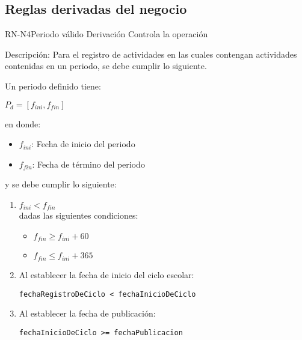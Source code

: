 \subsection{Reglas derivadas del negocio}


\begin{BusinessRule}{RN-N4}{Periodo válido}
	{Derivación}
	{Controla la operación}
	\item[Descripción:] 
	Para el registro de actividades en las cuales contengan actividades contenidas en un periodo, se debe cumplir lo siguiente.
	
	Un periodo definido tiene:\\
	\begin{center}
        $P_d = [f_{ini},f_{fin}] $ \\	
	\end{center}

	en donde:\\
	\begin{itemize}
	    \item $f_{ini}$: Fecha de inicio del periodo
	    \item $f_{fin}$: Fecha de término del periodo
	\end{itemize}
	
	y se debe cumplir lo siguiente:

	\begin{enumerate}
	    \item $f_{ini} < f_{fin}$ \\
	
		dadas las siguientes condiciones:
		\begin{itemize}
		    \item $f_{fin} \geq f_{ini}+60$
		    \item $f_{fin} \leq f_{ini}+365$
        \end{itemize}		
		\item  Al establecer la fecha de inicio del ciclo escolar:
		\begin{verbatim}fechaRegistroDeCiclo < fechaInicioDeCiclo\end{verbatim}
		\item  Al establecer la fecha de publicación:
		\begin{verbatim}fechaInicioDeCiclo >= fechaPublicacion\end{verbatim}
		
	\end{enumerate}

\end{BusinessRule}

